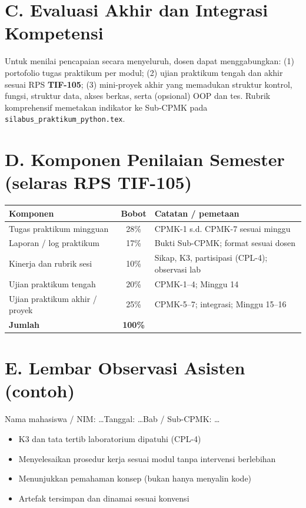 \section*{C. Evaluasi Akhir dan Integrasi Kompetensi}

Untuk menilai pencapaian secara menyeluruh, dosen dapat menggabungkan: (1) portofolio tugas praktikum per modul; (2) ujian praktikum tengah dan akhir sesuai RPS \textbf{TIF-105}; (3) mini-proyek akhir yang memadukan struktur kontrol, fungsi, struktur data, akses berkas, serta (opsional) OOP dan tes. Rubrik komprehensif memetakan indikator ke Sub-CPMK pada \texttt{silabus\_praktikum\_python.tex}.

\section*{D. Komponen Penilaian Semester (selaras RPS TIF-105)}

\begin{tabular}{|l|c|p{7cm}|}
\hline
\textbf{Komponen} & \textbf{Bobot} & \textbf{Catatan / pemetaan} \\
\hline
Tugas praktikum mingguan & 28\% & CPMK-1 s.d. CPMK-7 sesuai minggu \\
\hline
Laporan / log praktikum & 17\% & Bukti Sub-CPMK; format sesuai dosen \\
\hline
Kinerja dan rubrik sesi & 10\% & Sikap, K3, partisipasi (CPL-4); observasi lab \\
\hline
Ujian praktikum tengah & 20\% & CPMK-1--4; Minggu 14 \\
\hline
Ujian praktikum akhir / proyek & 25\% & CPMK-5--7; integrasi; Minggu 15--16 \\
\hline
\textbf{Jumlah} & \textbf{100\%} & \\
\hline
\end{tabular}

\section*{E. Lembar Observasi Asisten (contoh)}

Nama mahasiswa / NIM: \ldots\quad Tanggal: \ldots\quad Bab / Sub-CPMK: \ldots

\begin{itemize}[leftmargin=*, label=$\square$]
  \item K3 dan tata tertib laboratorium dipatuhi (CPL-4)
  \item Menyelesaikan prosedur kerja sesuai modul tanpa intervensi berlebihan
  \item Menunjukkan pemahaman konsep (bukan hanya menyalin kode)
  \item Artefak tersimpan dan dinamai sesuai konvensi
\end{itemize}

